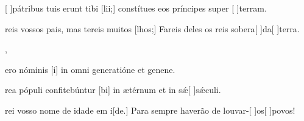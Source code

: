 {  {\item {}[ ]{pá}tribus tuis erunt tibi [lii;] constítues eos príncipes super [ ]{ter}ram.~\Antiphona}%
    {\item {}reis vossos pais, mas tereis muitos [lhos;] Fareis deles os reis sobera[ ]{da}[ ]{ter}ra.~\Antiphona},
  {\item {} ero nóminis [i] in omni generatióne et genene.~\Antiphona
      \item {}rea pópuli confitebúntur [bi] in ætérnum et in sǽ[ ]{sǽ}culi.~\Antiphona}%
    {\item {}rei vosso nome de idade em i[de.] Para sempre haverão de louvar-[ ]{os}[ ]{po}vos!~\Antiphona}
}